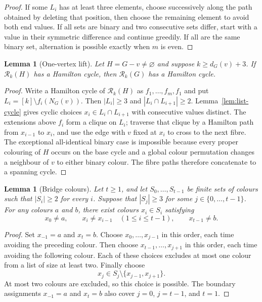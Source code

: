 \documentclass[11pt]{article}
\newtheorem{lemma}[theorem]{Lemma}
\theoremstyle{remark}
\newcommand{\Rk}{\mathcal R_k}
\numberwithin{equation}{section}
\numberwithin{table}{section}
\begin{document}
\begin{proof}
If some $L_i$ has at least three elements, choose successively along the path obtained by deleting that position, then choose the remaining element to avoid both end values.  If all sets are binary and two consecutive sets differ, start with a value in their symmetric difference and continue greedily.  If all are the same binary set, alternation is possible exactly when $m$ is even.
\end{proof}

\begin{lemma}[One-vertex lift]
\label{lem:single-lift}
Let $H=G-v\ne\varnothing$ and suppose $k\ge d_G(v)+3$.  If $\Rk(H)$ has a Hamilton cycle, then $\Rk(G)$ has a Hamilton cycle.
\end{lemma}

\begin{proof}
Write a Hamilton cycle of $\Rk(H)$ as $f_1,\ldots,f_m,f_1$ and put $L_i=[k]\setminus f_i(N_G(v))$.  Then $|L_i|\ge3$ and $|L_i\cap L_{i+1}|\ge2$.  Lemma~\ref{lem:list-cycle} gives cyclic choices $x_i\in L_i\cap L_{i+1}$ with consecutive values distinct.  The extensions above $f_i$ form a clique on $L_i$; traverse that clique by a Hamilton path from $x_{i-1}$ to $x_i$, and use the edge with $v$ fixed at $x_i$ to cross to the next fibre.  The exceptional all-identical binary case is impossible because every proper colouring of $H$ occurs on the base cycle and a global colour permutation changes a neighbour of $v$ to either binary colour.  The fibre paths therefore concatenate to a spanning cycle.
\end{proof}


\begin{lemma}[Bridge colours]\label{lem:bridge-colours}
Let $t\ge1$, and let $S_0,\ldots,S_{t-1}$ be finite sets of colours
such that $|S_i|\ge2$ for every $i$. Suppose that $|S_j|\ge3$ for
some $j\in\{0,\ldots,t-1\}$. For any colours $a$ and $b$, there exist
colours $x_i\in S_i$ satisfying
\[
x_0\ne a,\qquad
x_i\ne x_{i-1}\quad(1\le i\le t-1),\qquad
x_{t-1}\ne b.
\]
\end{lemma}

\begin{proof}
Set $x_{-1}=a$ and $x_t=b$. Choose $x_0,\ldots,x_{j-1}$ in this
order, each time avoiding the preceding colour. Then choose
$x_{t-1},\ldots,x_{j+1}$ in this order, each time avoiding the following
colour. Each of these choices excludes at most one colour from a list of
size at least two. Finally choose
\[
x_j\in S_j\setminus\{x_{j-1},x_{j+1}\}.
\]
At most two colours are excluded, so this choice is possible. The
boundary assignments $x_{-1}=a$ and $x_t=b$ also cover $j=0$,
$j=t-1$, and $t=1$.
\end{proof}
\end{document}
